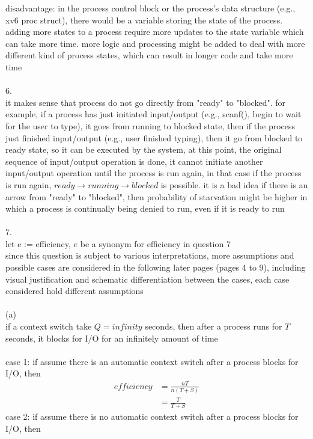 \documentclass[12pt, border = 4pt, multi]{article} %
\begin{document}
disadvantage: in the process control block or the process's data structure (e.g., xv6 proc struct), there would be a variable storing the state of the process. adding more states to a process require more updates to the state variable which can take more time. more logic and processing might be added to deal with more different kind of process states, which can result in longer code and take more time\\
\\
6.\\
it makes sense that process do not go directly from "ready" to "blocked". for example, if a process has just initiated input/output (e.g., scanf(), begin to wait for the user to type), it goes from running to blocked state, then if the process just finished input/output (e.g., user finished typing), then it go from blocked to ready state, so it can be executed by the system, at this point, the original sequence of input/output operation is done, it cannot initiate another input/output operation until the process is run again, in that case if the process is run again, $ready \rightarrow running \rightarrow blocked$ is possible. it is a bad idea if there is an arrow from "ready" to "blocked", then probability of starvation might be higher in which a process is continually being denied to run, even if it is ready to run\\
\\
7.\\
let e := efficiency, $e$ be a synonym for efficiency in question 7\\
since this question is subject to various interpretations, more assumptions and possible cases are considered in the following later pages (pages 4 to 9), including visual justification and schematic differentiation between the cases, each case considered hold different assumptions\\
\\
(a)\\
if a context switch take $Q = infinity$ seconds, then after a process runs for $T$ seconds, it blocks for I/O for an infinitely amount of time\\
\\
case 1: if assume there is an automatic context switch after a process blocks for I/O, then
\begin{align*}
efficiency &= \frac{nT}{n(T + S)}\\
&= \frac{T}{T + S}
\end{align*}
case 2: if assume there is no automatic context switch after a process blocks for I/O, then
\end{document}
